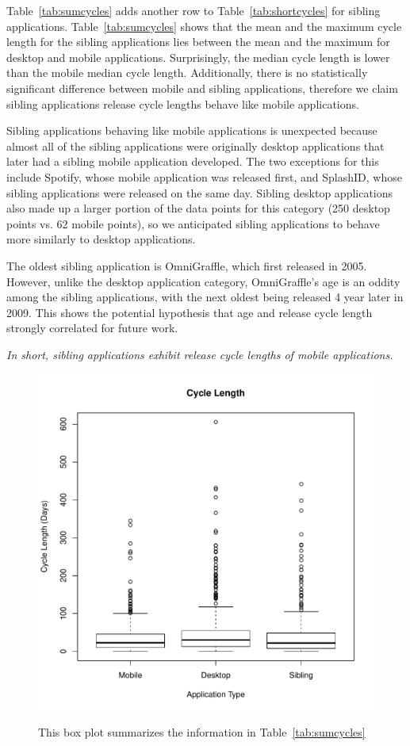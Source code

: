 \documentclass{acm_proc_article-sp}
\begin{document}
Table~\ref{tab:sumcycles} adds another row to Table~\ref{tab:shortcycles} for sibling applications. 
Table~\ref{tab:sumcycles} shows that the mean and the maximum cycle length for the sibling applications lies between the mean and the maximum for desktop and mobile applications. 
Surprisingly, the median cycle length is lower than the mobile median cycle length. 
Additionally, there is no statistically significant difference between mobile and sibling applications, therefore we claim sibling applications release cycle lengths behave like mobile applications.


Sibling applications behaving like mobile applications is unexpected because almost all of the sibling applications were originally desktop applications that later had a sibling mobile application developed.
The two exceptions for this include Spotify, whose mobile application was released first, and SplashID, whose sibling applications were released on the same day.
Sibling desktop applications also made up a larger portion of the data points for this category (250 desktop points vs. 62 mobile points), so we anticipated sibling applications to behave more similarly to desktop applications.

The oldest sibling application is OmniGraffle, which first released in 2005.
However, unlike the desktop application category, OmniGraffle's age is an oddity among the sibling applications, with the next oldest being released 4 year later in 2009. 
This shows the potential hypothesis that age and release cycle length strongly correlated for future work.

\textit{In short, sibling applications exhibit release cycle lengths of mobile applications.}



\begin{figure}
\begin{center}
\includegraphics[width=.5\textwidth]{CycleBoxPlot.pdf}
\label{fig:CycleBox}
\caption{This box plot summarizes the information in Table~\ref{tab:sumcycles}}
\end{center}
\end{figure}
\end{document}
